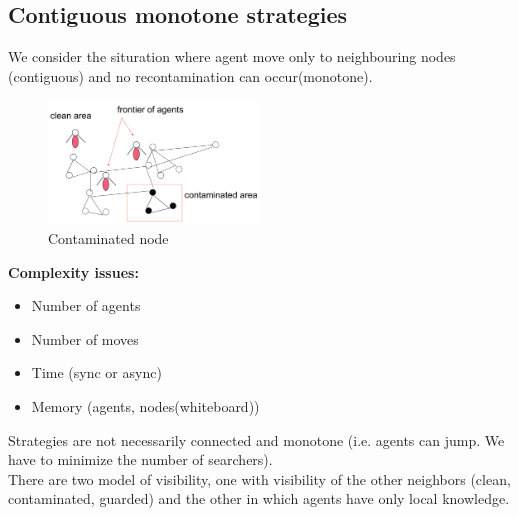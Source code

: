 \documentclass[paper=a4, fontsize=11pt]{scrartcl} %
\numberwithin{equation}{section} %
\numberwithin{figure}{section} %
\numberwithin{table}{section} %
\begin{document}
\subsection*{Contiguous monotone strategies}
We consider the situration where agent move only to neighbouring nodes (contiguous) and no recontamination can occur(monotone).
\begin{figure}[H]
  \centering
  \includegraphics[width=0.5\textwidth]{img/cont_2.png}
  \caption{Contaminated node}
  \label{fig:boat1}
\end{figure}
\textbf{Complexity issues:}
\begin{itemize}
\item Number of agents
\item Number of moves
\item Time (sync or async)
\item Memory (agents, nodes(whiteboard))
\end{itemize}
Strategies are not necessarily connected and monotone (i.e. agents can jump. We have to minimize the number of searchers).\\
There are two model of visibility, one with visibility of the other neighbors (clean, contaminated, guarded) and the other in which agents have only local knowledge.
\end{document}
